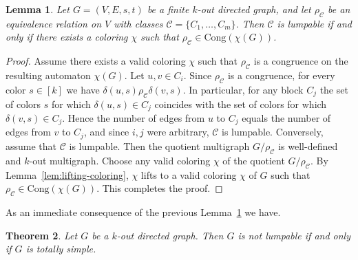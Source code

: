 \documentclass[a4paper,10pt]{amsart}
\theoremstyle{plain}
\newtheorem{theorem}{Theorem}[section]
\newtheorem{lemma}[theorem]{Lemma}
\theoremstyle{definition}
\begin{document}
\begin{lemma}\label{lem: lump=congr}
Let $G=(V,E,s,t)$ be a finite $k$-out directed graph, and let $\rho_{\mathcal C}$ be an equivalence relation on $V$ with classes $\mathcal C=\{C_1,\dots,C_m\}$. Then $\mathcal C$ is lumpable if and only if there exists a coloring $\chi$ such that $\rho_{\mathcal{C}}\in \mathrm{Cong}(\chi(G))$.
\end{lemma}
\begin{proof}
Assume there exists a valid coloring $\chi$ such that $\rho_{\mathcal{C}}$ is a congruence on the resulting automaton $\chi(G)$. Let $u,v\in C_i$. Since $\rho_{\mathcal{C}}$ is a congruence, for every color $s\in [k]$ we have $\delta(u,s)\rho_{\mathcal{C}} \delta(v,s)$. In particular, for any block $C_j$ the set of colors $s$ for which $\delta(u,s)\in C_j$
coincides with the set of colors for which $\delta(v,s)\in C_j$. Hence the number of edges from $u$ to $C_j$ equals the number of edges
from $v$ to $C_j$, and since $i,j$ were arbitrary, $\mathcal C$ is lumpable.
Conversely, assume that $\mathcal C$ is lumpable. Then the quotient multigraph $G/\rho_{\mathcal C}$ is well-defined and $k$-out multigraph.
Choose any valid coloring $\chi$ of the quotient $G/\rho_{\mathcal C}$. By Lemma~\ref{lem:lifting-coloring}, $\chi$ lifts to a valid coloring $\chi$ of $G$ such that $\rho_{\mathcal C}\in\mathrm{Cong}(\chi(G))$. This completes the proof.
\end{proof}
As an immediate consequence of the previous Lemma~\ref{lem: lump=congr} we have. 
\begin{theorem}\label{theo: lump=to simple}
Let $G$ be a $k$-out directed graph. Then $G$ is not lumpable if and only if $G$ is totally simple. 
\end{theorem}
\end{document}
